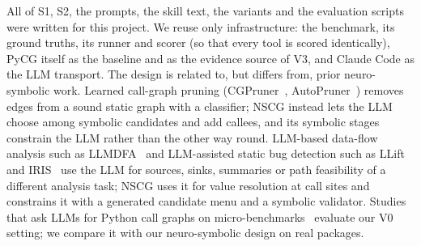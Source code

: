 All of S1, S2, the prompts, the skill text, the variants and the evaluation
scripts were written for this project. We reuse only infrastructure: the
benchmark, its ground truths, its runner and scorer (so that every tool is
scored identically), PyCG itself as the baseline and as the evidence source of
V3, and Claude Code as the LLM transport. The design is related to, but
differs from, prior neuro-symbolic work. Learned call-graph pruning
(CGPruner~\cite{utture2022cgpruner}, AutoPruner~\cite{le2022autopruner})
removes edges from a sound static graph with a classifier; NSCG instead lets
the LLM choose among symbolic candidates and add callees, and its symbolic
stages constrain the LLM rather than the other way round. LLM-based data-flow
analysis such as LLMDFA~\cite{wang2024llmdfa} and LLM-assisted static bug
detection such as LLift~\cite{li2024llift} and IRIS~\cite{li2025iris} use the
LLM for sources, sinks, summaries or path feasibility of a different analysis
task; NSCG uses it for value resolution at call sites and constrains it with a
generated candidate menu and a symbolic validator. Studies that ask LLMs for
Python call graphs on micro-benchmarks~\cite{venkatesh2024emergence} evaluate
our V0 setting; we compare it with our neuro-symbolic design on real packages.
